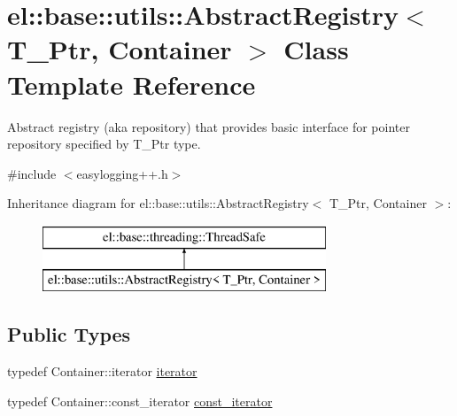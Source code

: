 \hypertarget{classel_1_1base_1_1utils_1_1_abstract_registry}{}\section{el\+:\+:base\+:\+:utils\+:\+:Abstract\+Registry$<$ T\+\_\+\+Ptr, Container $>$ Class Template Reference}
\label{classel_1_1base_1_1utils_1_1_abstract_registry}


Abstract registry (aka repository) that provides basic interface for pointer repository specified by T\+\_\+\+Ptr type.  




{\ttfamily \#include $<$easylogging++.\+h$>$}

Inheritance diagram for el\+:\+:base\+:\+:utils\+:\+:Abstract\+Registry$<$ T\+\_\+\+Ptr, Container $>$\+:\begin{figure}[H]
\begin{center}
\leavevmode
\includegraphics[height=2.000000cm]{classel_1_1base_1_1utils_1_1_abstract_registry}
\end{center}
\end{figure}
\subsection*{Public Types}
\begin{DoxyCompactItemize}
\item 
typedef Container\+::iterator \hyperlink{classel_1_1base_1_1utils_1_1_abstract_registry_a58d0536c748633afd3f7c237b63a9a7c}{iterator}
\item 
typedef Container\+::const\+\_\+iterator \hyperlink{classel_1_1base_1_1utils_1_1_abstract_registry_a3bbf19b112c067cb1a02a82b003cc7e2}{const\+\_\+iterator}
\end{DoxyCompactItemize}
